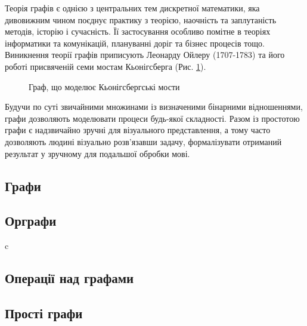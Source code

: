 Теорія графів є однією з центральних тем дискретної математики, яка дивовижним чином поєднує практику з теорією, наочність та заплутаність методів, історію і сучасність.
Її застосування особливо помітне в теоріях інформатики та комунікацій, плануванні доріг та бізнес процесів тощо.
Виникнення теорії графів приписують Леонарду Ойлеру (1707-1783) та його роботі присвяченій семи мостам Кьонігсберга (Рис. \ref{koenigsberg_graph}).
\begin{figure}[h]
        \centering
                
        \caption{Граф, що моделює Кьонігсбергські мости}
        \label{koenigsberg_graph}
\end{figure}
Будучи по суті звичайними множинами із визначеними бінарними відношеннями, графи дозволяють моделювати процеси будь-якої складності.
Разом із простотою графи є надзвичайно зручні для візуального представлення, а тому часто дозволяють людині візуально розв'язавши задачу, формалізувати отриманий результат у зручному для подальшої обробки мові.

\newpage
\subsection{Графи}


\newpage
\subsection{Орграфи}


c\newpage
\subsection{Операції над графами}


\newpage
\subsection{Прості графи}

